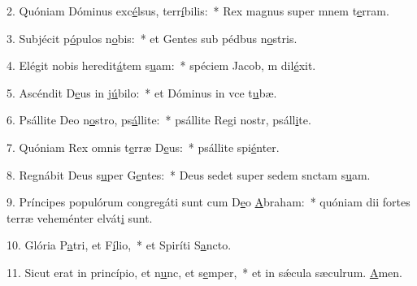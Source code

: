 2. Quóniam Dóminus exc\uline{é}lsus, terr\uline{í}bilis:~* Rex magnus super mnem t\uline{e}rram.\par 
3. Subjécit p\uline{ó}pulos n\uline{o}bis:~* et Gentes sub pédbus n\uline{o}stris.\par 
4. Elégit nobis heredit\uline{á}tem s\uline{u}am:~* spéciem Jacob, m dil\uline{é}xit.\par 
5. Ascéndit D\uline{e}us in j\uline{ú}bilo:~* et Dóminus in vce t\uline{u}bæ.\par 
6. Psállite Deo n\uline{o}stro, ps\uline{á}llite:~* psállite Regi nostr, psáll\uline{i}te.\par 
7. Quóniam Rex omnis t\uline{e}rræ D\uline{e}us:~* psállite spi\uline{é}nter.\par 
8. Regnábit Deus s\uline{u}per G\uline{e}ntes:~* Deus sedet super sedem snctam s\uline{u}am.\par 
9. Príncipes populórum congregáti sunt cum D\uline{e}o \uline{A}braham:~* quóniam dii fortes terræ veheménter elvát\uline{i} sunt.\par 
10. Glória P\uline{a}tri, et F\uline{í}lio,~* et Spiríti S\uline{a}ncto.\par 
11. Sicut erat in princípio, et n\uline{u}nc, et s\uline{e}mper,~* et in sǽcula sæculrum. \uline{A}men.\par 
